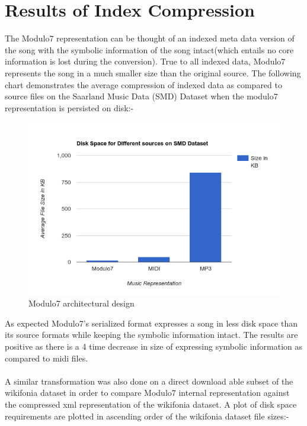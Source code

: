 \section{Results of Index Compression}

\noindent The Modulo7 representation can be thought of an indexed meta data version of the song with the symbolic information of the song intact(which entails no core information is lost during the conversion). True to all indexed data, Modulo7 represents the song in a much smaller size than the original source. The following chart demonstrates the average compression of indexed data as compared to source files on the Saarland Music Data (SMD) Dataset \cite{saarlandmsd} when the modulo7 representation is persisted on disk:-
\begin{figure}
\centering
\includegraphics[width=\textwidth]{Modulo7SMDBarGraph.png}
\makeatletter
\let\@currsize\normalsize
\caption{Modulo7 architectural design}
\label{fig:figure}
\end{figure}
As expected Modulo7's serialized format expresses a song in less disk space than its source formats while keeping the symbolic information intact. The results are positive as there is a 4 time decrease in size of expressing symbolic information as compared to midi files. \\\\
A similar transformation was also done on a direct download able subset of the wikifonia dataset in order to compare Modulo7 internal representation against the compressed xml representation of the wikifonia dataset. A plot of disk space requirements are plotted in ascending order of the wikifonia dataset file sizes:- 
